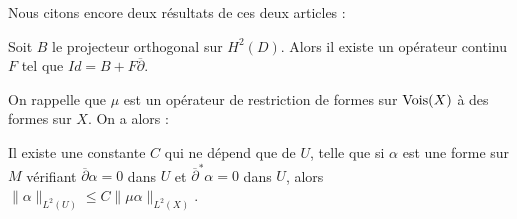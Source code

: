Nous citons encore deux résultats de ces deux articles :
\begin{prop}
Soit $B$ le projecteur orthogonal sur $H^2(D)$. Alors il existe un opérateur continu $F$ tel que $Id = B + F\overline{\partial}$.
\end{prop}
On rappelle que $\mu$ est un opérateur de restriction de formes sur $\operatorname{Vois}(X)$ à des formes sur $X$. On a alors :
\begin{prop}
Il existe une constante $C$ qui ne dépend que de $U$, telle que si $\alpha$ est une forme sur $M$ vérifiant $\overline{\partial}\alpha=0$ dans $U$ et $\overline{\partial}^{*}\alpha=0$ dans $U$, alors $\|\alpha\|_{L^2(U)} \leq C\|\mu\alpha\|_{L^2(X)}$.
\end{prop}
